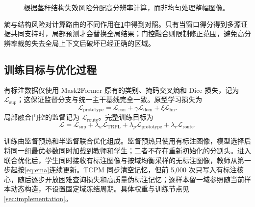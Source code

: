\begin{figure}[!htbp]
\centering
\caption{\BAZR 根据茎秆结构失效风险分配高分辨率计算，而非均匀处理整幅图像。}
\label{fig:bazr}
\end{figure}

熵与结构风险对计算路由的不同作用在\cref{fig:bazr}中得到对照。只有当窗口得分得到多源证据共同支持时，局部预测才会替换全局结果；门控融合则限制修正范围，避免高分辨率裁剪失去全局上下文后破坏已经正确的区域。

\subsection{训练目标与优化过程}

有标注数据仅使用 Mask2Former 原有的类别、掩码交叉熵和 Dice 损失，记为 $\mathcal L_{\mathrm{sup}}$；这保证监督分支与统一主干基线完全一致。原型学习损失为
\begin{equation}
\mathcal L_{\mathrm{prototype}}
=\mathcal L_{\mathrm{con}}
+\gamma\mathcal L_{\mathrm{dom}}
+\xi\mathcal L_{\mathrm{hn}}.
\end{equation}
局部融合门控的监督记为 $\mathcal L_{\mathrm{route}}$。完整训练目标为
\begin{equation}
\mathcal L=
\mathcal L_{\mathrm{sup}}
+\lambda_u\mathcal L_{\mathrm{TRPL}}
+\lambda_p\mathcal L_{\mathrm{prototype}}
+\lambda_r\mathcal L_{\mathrm{route}}.
\label{eq:total}
\end{equation}

训练由监督预热和半监督联合优化组成。监督预热只使用有标注图像，模型选择后将同一组最优参数同时加载到教师和学生；二者不存在重新初始化的分割头。进入联合优化后，学生同时接收有标注图像与按域均衡采样的无标注图像，教师从第一步起按\cref{eq:ema}连续更新。TCPM 同步清空记忆，但前 5,000 次只写入有标注核心，随后逐步开放困难查询损失和高质量伪标注记忆；逐样本留一域参照随当前样本动态构造，不设置固定域冻结周期。具体权重与训练节点见\cref{sec:implementation}。
